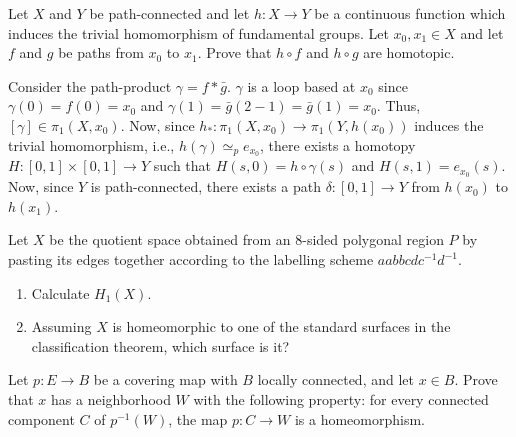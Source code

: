 \begin{problem}
  Let $X$ and $Y$ be path-connected and let $h\colon X\to Y$ be a
  continuous function which induces the trivial homomorphism of fundamental
  groups. Let $x_0,x_1\in X$ and let $f$ and $g$ be paths from $x_0$ to
  $x_1$. Prove that $h\circ f$ and $h\circ g$ are homotopic.
\end{problem}
\begin{solution}
  Consider the path-product $\gamma= f*\bar g$. $\gamma$ is a loop based at
  $x_0$ since $\gamma(0)=f(0)=x_0$ and
  $\gamma(1)=\bar g(2-1)=\bar g(1)=x_0$. Thus,
  $[\gamma]\in\pi_1(X,x_0)$. Now, since
  $h_*\colon\pi_1(X,x_0)\to\pi_1(Y,h(x_0))$ induces the trivial
  homomorphism, i.e., $h(\gamma)\simeq_p e_{x_0}$, there exists a homotopy
  $H\colon [0,1]\times[0,1]\to Y$ such that $H(s,0)=h\circ\gamma(s)$ and
  $H(s,1)=e_{x_0}(s)$. Now, since $Y$ is path-connected, there exists a
  path $\delta\colon[0,1]\to Y$ from $h(x_0)$ to $h(x_1)$.
\end{solution}
\begin{problem}
  Let $X$ be the quotient space obtained from an $8$-sided polygonal region
  $P$ by pasting its edges together according to the labelling scheme
  $aabbcdc^{-1}d^{-1}$.
  \begin{enumerate}[noitemsep,label=(\roman*)]
  \item Calculate $H_1(X)$.
  \item Assuming $X$ is homeomorphic to one of the standard surfaces in the
    classification theorem, which surface is it?
  \end{enumerate}
\end{problem}
\begin{solution}
\end{solution}
\begin{problem}
  Let $p\colon E\to B$ be a covering map with $B$ locally connected, and
  let $x\in B$. Prove that $x$ has a neighborhood $W$ with the following
  property: for every connected component $C$ of $p^{-1}(W)$, the map
  $p\colon C\to W$ is a homeomorphism.
\end{problem}
\begin{solution}
\end{solution}


